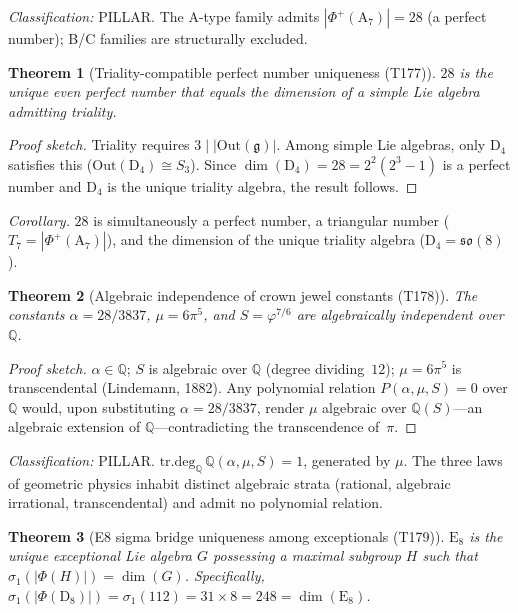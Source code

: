 \documentclass[aps,prd,twocolumn,superscriptaddress,floatfix,nofootinbib]{revtex4-2}
\newtheorem{theorem}{Theorem}
\theoremstyle{definition}
\theoremstyle{remark}
\newcommand{\vp}{\varphi}
\begin{document}
\noindent\textit{Classification:} PILLAR\@.  The A-type family admits
$|\Phi^+(\mathrm{A}_7)| = 28$ (a perfect number); B/C families are
structurally excluded.

\begin{theorem}[Triality-compatible perfect number uniqueness (T177)]
\label{thm:triality-28}
$28$ is the unique even perfect number that equals the dimension of a
simple Lie algebra admitting triality.
\end{theorem}

\begin{proof}[Proof sketch]
Triality requires $3 \mid |\mathrm{Out}(\mathfrak{g})|$.  Among
simple Lie algebras, only $\mathrm{D}_4$ satisfies this
($\mathrm{Out}(\mathrm{D}_4) \cong S_3$).  Since
$\dim(\mathrm{D}_4) = 28 = 2^2(2^3 - 1)$ is a perfect number and
$\mathrm{D}_4$ is the unique triality algebra, the result follows.
\end{proof}

\noindent\textit{Corollary.} $28$ is simultaneously a perfect number,
a triangular number ($T_7 = |\Phi^+(\mathrm{A}_7)|$), and the
dimension of the unique triality algebra ($\mathrm{D}_4 = \mathfrak{so}(8)$).

\begin{theorem}[Algebraic independence of crown jewel constants (T178)]
\label{thm:algebraic-independence}
The constants $\alpha = 28/3837$, $\mu = 6\pi^5$, and
$S = \vp^{7/6}$ are algebraically independent over~$\mathbb{Q}$.
\end{theorem}

\begin{proof}[Proof sketch]
$\alpha \in \mathbb{Q}$; $S$ is algebraic over $\mathbb{Q}$
(degree dividing~$12$); $\mu = 6\pi^5$ is transcendental
(Lindemann, 1882).  Any polynomial relation
$P(\alpha, \mu, S) = 0$ over $\mathbb{Q}$ would, upon substituting
$\alpha = 28/3837$, render $\mu$ algebraic over $\mathbb{Q}(S)$---an
algebraic extension of $\mathbb{Q}$---contradicting the
transcendence of~$\pi$.
\end{proof}

\noindent\textit{Classification:} PILLAR\@.
$\mathrm{tr.deg}_{\mathbb{Q}}\,\mathbb{Q}(\alpha,\mu,S) = 1$,
generated by $\mu$.  The three laws of geometric physics inhabit
distinct algebraic strata (rational, algebraic irrational,
transcendental) and admit no polynomial relation.

\begin{theorem}[E8 sigma bridge uniqueness among exceptionals (T179)]
\label{thm:e8-sigma-unique}
$\mathrm{E}_8$ is the unique exceptional Lie algebra $G$ possessing a
maximal subgroup $H$ such that
$\sigma_1(|\Phi(H)|) = \dim(G)$.  Specifically,
$\sigma_1(|\Phi(\mathrm{D}_8)|) = \sigma_1(112) = 31 \times 8 = 248 = \dim(\mathrm{E}_8)$.
\end{theorem}
\end{document}
